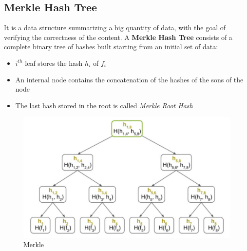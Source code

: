 \subsection{Merkle Hash Tree}
\begin{paracol}{2}
   It is a data structure summarizing a big quantity of data, with the goal of verifying the correctness of the content.
   A \textbf{Merkle Hash Tree} consists of a complete binary tree of hashes built starting from an initial set of data:
   \begin{itemize}
      \item $i^{th}$ leaf stores the hash $h_i$ of $f_i$ 
      \item An internal node contains the concatenation of the hashes of the sons of the node
      \item The last hash stored in the root is called \textit{Merkle Root Hash}
   \end{itemize}
   
\switchcolumn

\begin{figure}[htbp]
   \centering
   \includegraphics{images/merkle.png}
   \caption{Merkle}
   \label{fig:merkle}
\end{figure}
\end{paracol}

